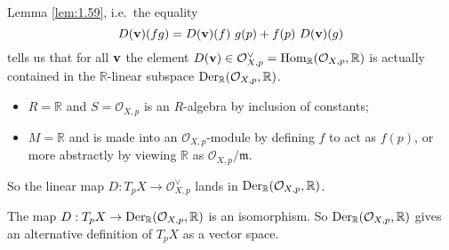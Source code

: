 \documentclass[a4paper,11pt]{article}
\begin{document}
	Lemma \ref{lem:1.59}, i.e.\ the equality
	\[
		D(\vb v) (fg) = D(\vb v)(f)\ g(p) + f(p)\ D(\vb v)(g)
	\]
	tells us that for all $\vb v$ the element $D(\vb v)\in \mathcal{O}_{X,p}^{\vee} = \operatorname{Hom}_{\mathbb{R}}(\mathcal{O}_{X,p},\mathbb{R})$ is actually contained in the $\mathbb{R}$-linear subspace $\operatorname{Der}_{\mathbb{R}}(\mathcal{O}_{X,p},\mathbb{R})$.
	
	\begin{itemize}
		\item $R = \mathbb{R}$ and $S = \mathcal{O}_{X,p}$ is an $R$-algebra by inclusion of constants;
		\item $M = \mathbb{R}$ and is made into an $\mathcal{O}_{X,p}$-module by defining $f$ to act as $f(p)$, or more abstractly by viewing $\mathbb{R}$ as $\mathcal{O}_{X,p}/\mathfrak{m}$.
	\end{itemize}

	So the linear map $D : T_p X \to \mathcal{O}_{X,p}^{\vee}$ lands in $\operatorname{Der}_{\mathbb{R}}(\mathcal{O}_{X,p},\mathbb{R})$.

	\begin{prop}
		The map $D : T_p X \to \operatorname{Der}_{\mathbb{R}}(\mathcal{O}_{X,p}, \mathbb{R})$ is an isomorphism. So $\operatorname{Der}_{\mathbb{R}}(\mathcal{O}_{X,p},\mathbb{R})$ gives an alternative definition of $T_p X$ as a vector space. 
	\end{prop}
\end{document}

